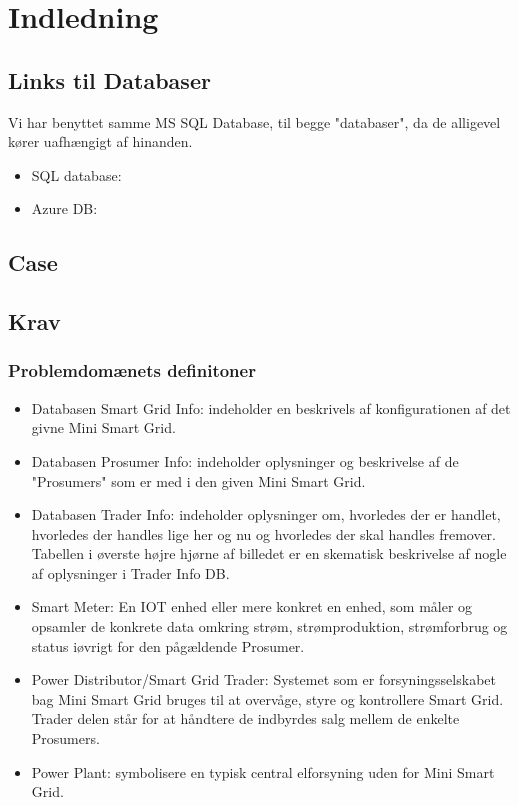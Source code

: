 
\section{Indledning}

\subsection{Links til Databaser}
Vi har benyttet samme MS SQL Database, til begge "databaser", da de alligevel kører uafhængigt af hinanden.

\begin{itemize}
    \item SQL database: 
    \item Azure DB:
\end{itemize}

\subsection{Case}



\subsection{Krav}
\subsubsection{Problemdomænets definitoner}
\begin{itemize}
    \item Databasen Smart Grid Info: indeholder en beskrivels af konfigurationen af det givne Mini Smart Grid.
    \item Databasen Prosumer Info: indeholder oplysninger og beskrivelse af de "Prosumers" som er med i den given Mini Smart Grid.
    \item Databasen Trader Info: indeholder oplysninger om, hvorledes der er handlet, hvorledes der handles lige her og nu og hvorledes der skal handles fremover. Tabellen i øverste højre hjørne af billedet er en skematisk beskrivelse af nogle af oplysninger i Trader Info DB.
    \item Smart Meter: En IOT enhed eller mere konkret en enhed, som måler og opsamler de konkrete data omkring strøm, strømproduktion, strømforbrug og status iøvrigt for den pågældende Prosumer.
    \item Power Distributor/Smart Grid Trader: Systemet som er forsyningsselskabet bag Mini Smart Grid bruges til at overvåge, styre og kontrollere Smart Grid. Trader delen står for at håndtere de indbyrdes salg mellem de enkelte Prosumers.
    \item Power Plant: symbolisere en typisk central elforsyning uden for Mini Smart Grid.
\end{itemize}

